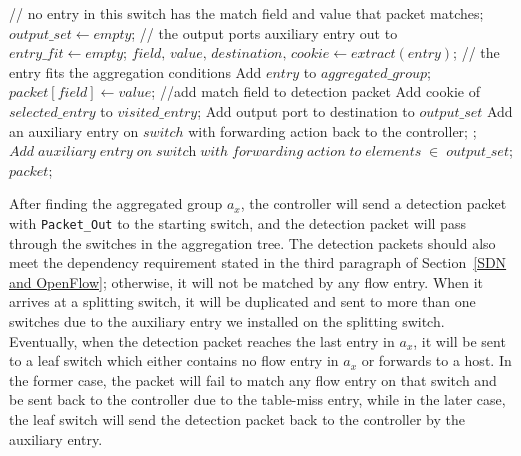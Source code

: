 \documentclass[conference]{IEEEtran}
\begin{document}
\begin{algorithm}[ht]
  \begin{algorithmic}[1]
      \State // no entry in this switch has the match field and value that packet matches;
      \State $\textit{output\_set} \gets empty$;  //  the output ports auxiliary entry out to
      \State $\textit{entry\_fit} \gets empty$; 
        \State $\textit{field, value, destination, cookie} \gets extract(\textit{entry})$;
          //  the entry fits the aggregation conditions
          \State Add $entry$ to $aggregated\_group$;
          \State $\textit{packet}[\textit{field}] \gets \textit{value}$;  //add match field to detection packet
          \State Add cookie of $selected\_entry$ to $visited\_entry$;
          \State Add output port to destination to $output\_set$
            \State Add an auxiliary entry on $switch$ with forwarding action back to the controller;
          \EndIf
          \State {}; 
        \EndIf
      \EndFor
        \State $Add\;auxiliary\;entry\;on\;\textit{switch}\;with\;forwarding\;action\;to\;elements\;\in\;
        \textit{output\_set}$;
      \EndIf
      \State \Return $packet$;
    \EndFunction
\end{algorithmic}
\end{algorithm}

After finding the aggregated group $a_x$, the controller will send a detection packet with \texttt{Packet\_Out} to the starting switch, and the detection packet will pass through the switches in the aggregation tree. The detection packets should also meet the dependency requirement stated in the third paragraph of Section~\ref{SDN and OpenFlow}; otherwise, it will not be matched by any flow entry. When it arrives at a splitting switch, it will be duplicated and sent to more than one switches due to the auxiliary entry we installed on the splitting switch. Eventually, when the detection packet reaches the last entry in $a_x$, it will be sent to a leaf switch which either contains no flow entry in $a_x$ or forwards to a host. In the former case, the packet will fail to match any flow entry on that switch and be sent back to the controller due to the table-miss entry, while in the later case, the leaf switch will send the detection packet back to the controller by the auxiliary entry. 
\end{document}
